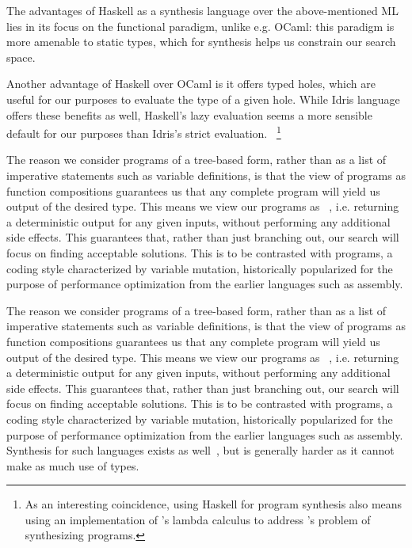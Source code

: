 \documentclass{article}
\begin{document}
The advantages of Haskell as a synthesis language over the above-mentioned ML lies in its focus on the functional paradigm,
unlike e.g. OCaml: this paradigm is more amenable to static types, which for synthesis helps us constrain our search space.

Another advantage of Haskell over OCaml is it offers typed holes, which are useful for our purposes to evaluate the type of a given hole.
While Idris language offers these benefits as well, Haskell's lazy evaluation seems a more sensible default for our purposes than Idris's strict evaluation.
~\footnote{As an interesting coincidence, using Haskell for program synthesis also means using an implementation of \citet{lambdacalculus}'s lambda calculus to address \citet{church1957applications}'s problem of synthesizing programs.}

The reason we consider programs of a tree-based form, rather than as a list of imperative statements such as variable definitions,
is that the view of programs as function compositions guarantees us that any complete program will yield us output of the desired type.
This means we view our programs as ~\citep{fortran95},
i.e. returning a deterministic output for any given inputs, without performing any additional side effects.
This guarantees that, rather than just branching out, our search will focus on finding acceptable solutions.
This is to be contrasted with  programs, a coding style characterized by variable mutation,
historically popularized for the purpose of performance optimization from the earlier languages such as assembly.

The reason we consider programs of a tree-based form, rather than as a list of imperative statements such as variable definitions,
is that the view of programs as function compositions guarantees us that any complete program will yield us output of the desired type.
This means we view our programs as ~\citep{fortran95},
i.e. returning a deterministic output for any given inputs, without performing any additional side effects.
This guarantees that, rather than just branching out, our search will focus on finding acceptable solutions.
This is to be contrasted with  programs, a coding style characterized by variable mutation,
historically popularized for the purpose of performance optimization from the earlier languages such as assembly.
Synthesis for such languages exists as well~\citep{shi2019frangel}, but is generally harder as it cannot make as much use of types.
\end{document}
